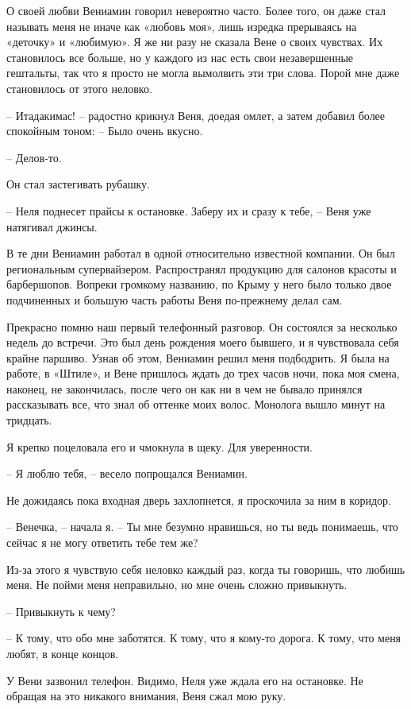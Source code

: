 \documentclass[
]{book}
\begin{document}
О своей любви Вениамин говорил невероятно часто. Более того, он даже стал называть меня не иначе как «любовь моя», лишь изредка прерываясь на «деточку» и «любимую». Я же ни разу не сказала Вене о своих чувствах. Их становилось все больше, но у каждого из нас есть свои незавершенные гештальты, так что я просто не могла вымолвить эти три слова. Порой мне даже становилось от этого неловко.

-- Итадакимас! -- радостно крикнул Веня, доедая омлет, а затем добавил более спокойным тоном: -- Было очень вкусно.

-- Делов-то.

Он стал застегивать рубашку.

-- Неля поднесет прайсы к остановке. Заберу их и сразу к тебе, -- Веня уже натягивал джинсы.

В те дни Вениамин работал в одной относительно известной компании. Он был региональным супервайзером. Распространял продукцию для салонов красоты и барбершопов. Вопреки громкому названию, по Крыму у него было только двое подчиненных и большую часть работы Веня по-прежнему делал сам.

Прекрасно помню наш первый телефонный разговор. Он состоялся за несколько недель до встречи. Это был день рождения моего бывшего, и я чувствовала себя крайне паршиво. Узнав об этом, Вениамин решил меня подбодрить. Я была на работе, в «Штиле», и Вене пришлось ждать до трех часов ночи, пока моя смена, наконец, не закончилась, после чего он как ни в чем не бывало принялся рассказывать все, что знал об оттенке моих волос. Монолога вышло минут на тридцать.

Я крепко поцеловала его и чмокнула в щеку. Для уверенности.

-- Я люблю тебя, -- весело попрощался Вениамин.

Не дожидаясь пока входная дверь захлопнется, я проскочила за ним в коридор.

-- Венечка, -- начала я. -- Ты мне безумно нравишься, но ты ведь понимаешь, что сейчас я не могу ответить тебе тем же?

Из-за этого я чувствую себя неловко каждый раз, когда ты говоришь, что любишь меня. Не пойми меня неправильно, но мне очень сложно привыкнуть.

-- Привыкнуть к чему?

-- К тому, что обо мне заботятся. К тому, что я кому-то дорога. К тому, что меня любят, в конце концов.

У Вени зазвонил телефон. Видимо, Неля уже ждала его на остановке. Не обращая на это никакого внимания, Веня сжал мою руку.
\end{document}
